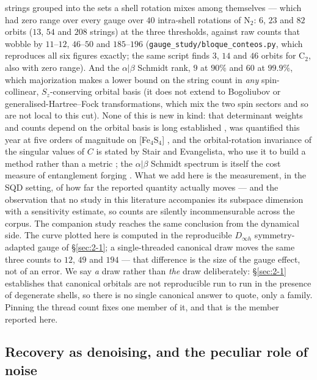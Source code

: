 \documentclass[onecolumn,a4paper]{quantumarticle}
\begin{document}
strings grouped into the sets a shell rotation mixes among themselves --- which had zero range over every gauge over $40$ intra-shell rotations of N$_2$: $6$, $23$ and $82$ orbits ($13$, $54$ and $208$ strings) at the three thresholds, against raw counts that wobble by $11$--$12$, $46$--$50$ and $185$--$196$ (\texttt{gauge\_study/bloque\_conteos.py}, which reproduces all six figures exactly; the same script finds $3$, $14$ and $46$ orbits for C$_2$, also with zero range). And the $\alpha|\beta$ Schmidt rank, $9$ at $90\%$ and $60$ at $99.9\%$, which majorization makes a lower bound on the string count in \emph{any} spin-collinear, $S_z$-conserving orbital basis (it does not extend to Bogoliubov or generalised-Hartree--Fock transformations, which mix the two spin sectors and so are not local to this cut). None of this is new in kind: that determinant weights and counts depend on the orbital basis is long established \cite{bytautas2003,abrams2005,alcoba2016,izsak2023}, was quantified this year at five orders of magnitude on [Fe$_4$S$_4$] \cite{zhangotten2026}, and the orbital-rotation invariance of the singular values of $C$ is stated by Stair and Evangelista, who use it to build a method rather than a metric \cite{stair2020}; the $\alpha|\beta$ Schmidt spectrum is itself the cost measure of entanglement forging \cite{eddins2022}. What we add here is the measurement, in the SQD setting, of how far the reported quantity actually moves --- and the observation that no study in this literature accompanies its subspace dimension with a sensitivity estimate, so counts are silently incommensurable across the corpus. The companion study \cite{bonilla2026spectral} reaches the same conclusion from the dynamical side. The curve plotted here is computed in the reproducible $D_{\infty h}$ symmetry-adapted gauge of \S\ref{sec:2-1}; a single-threaded canonical draw moves the same three counts to $12$, $49$ and $194$ --- that difference is the size of the gauge effect, not of an error. We say \emph{a} draw rather than \emph{the} draw deliberately: \S\ref{sec:2-1} establishes that canonical orbitals are not reproducible run to run in the presence of degenerate shells, so there is no single canonical answer to quote, only a family. Pinning the thread count fixes one member of it, and that is the member reported here.


\subsection{Recovery as denoising, and the peculiar role of noise}\label{sec:3-2}
\end{document}
